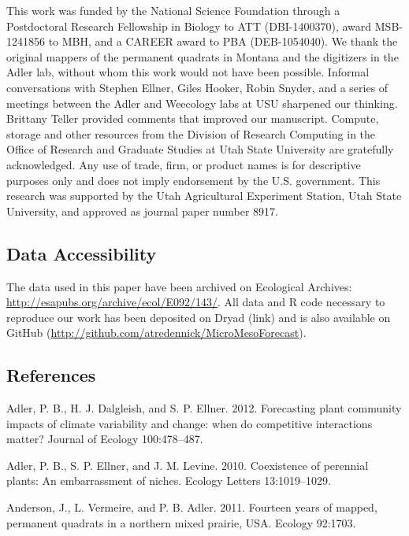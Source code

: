 \documentclass[12pt,]{article}
\begin{document}
This work was funded by the National Science Foundation through a
Postdoctoral Research Fellowship in Biology to ATT (DBI-1400370), award
MSB-1241856 to MBH, and a CAREER award to PBA (DEB-1054040). We thank
the original mappers of the permanent quadrats in Montana and the
digitizers in the Adler lab, without whom this work would not have been
possible. Informal conversations with Stephen Ellner, Giles Hooker,
Robin Snyder, and a series of meetings between the Adler and Weecology
labs at USU sharpened our thinking. Brittany Teller provided comments
that improved our manuscript. Compute, storage and other resources from
the Division of Research Computing in the Office of Research and
Graduate Studies at Utah State University are gratefully acknowledged.
Any use of trade, firm, or product names is for descriptive purposes
only and does not imply endorsement by the U.S. government. This
research was supported by the Utah Agricultural Experiment Station, Utah
State University, and approved as journal paper number 8917.

\subsection{Data Accessibility}\label{data-accessibility}

The data used in this paper have been archived on Ecological Archives:
\url{http://esapubs.org/archive/ecol/E092/143/}. All data and R code
necessary to reproduce our work has been deposited on Dryad (link) and
is also available on GitHub
(\url{http://github.com/atredennick/MicroMesoForecast}).

\pagebreak{}

\subsection*{References}\label{references}

Adler, P. B., H. J. Dalgleish, and S. P. Ellner. 2012. Forecasting plant
community impacts of climate variability and change: when do competitive
interactions matter? Journal of Ecology 100:478--487.

Adler, P. B., S. P. Ellner, and J. M. Levine. 2010. Coexistence of
perennial plants: An embarrassment of niches. Ecology Letters
13:1019--1029.

Anderson, J., L. Vermeire, and P. B. Adler. 2011. Fourteen years of
mapped, permanent quadrats in a northern mixed prairie, USA. Ecology
92:1703.
\end{document}
